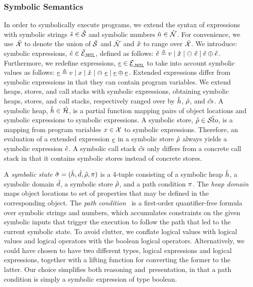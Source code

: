 \subsubsection{Symbolic Semantics}
In order to symbolically execute \jsil programs, we extend the syntax of \jsil expressions with 
symbolic strings $\hat{s} \in \hat{\mathcal{S}}$ and symbolic numbers $\hat{n} \in \hat{\mathcal{N}}$. 
For convenience, we use $\hat{\mathcal{X}}$ to denote the union of $\hat{\mathcal{S}}$ and $\hat{\mathcal{N}}$ 
and $\hat{x}$ to range over $\hat{\mathcal{X}}$. We introduce: \jsil symbolic expressions, $\hat{e} \in \hat{\mathcal{E}}_{\mathtt{JSIL}}$, defined as follows: $\hat{e} \triangleq v \mid \hat{x} \mid \ominus\ \hat{e} \mid \hat{e} \oplus \hat{e}$. 
Furthermore, we redefine \jsil expressions, $\underline{e} \in \underline{{\mathcal{E}}}_{\mathtt{JSIL}}$ to take into account symbolic values
 as follows: $\underline{e} \triangleq v \mid x \mid \hat{x} \mid \ominus\ \underline{e} \mid \underline{e} \oplus \underline{e}$.
Extended \jsil expressions differ from symbolic expressions in that they can contain program variables.
We extend heaps, stores, and call stacks with symbolic expressions, obtaining symbolic 
heaps, stores, and call stacks, respectively ranged over by $\hat{h}$, $\hat\rho$, and $\hat{cs}$.
A symbolic heap, $\hat{h} \in \hat{\mathcal H}$, is a partial function mapping pairs of  
object locations and symbolic expressions to symbolic expressions. 
A symbolic store, $\hat\rho \in \hat{{\mathcal S}to}$, is a mapping from program variables 
$x \in \mathcal{X}$ to symbolic expressions. Therefore, an evaluation of a \jsil extended expression $\underline{e}$ in a symbolic store $\hat\rho$ always yields a 
symbolic expression $\hat{e}$.
A symbolic call stack $\hat{cs}$ only differs from a concrete call stack in that it contains 
symbolic stores instead of concrete stores.


A \emph{symbolic state} $\hat{\sigma} = (\hat{h}, \hat{d}, \hat\rho, \pi)$ is a 4-tuple consisting of a 
symbolic heap $\hat{h}$, a symbolic domain $\hat{d}$, a symbolic store $\hat\rho$, and a path condition $\pi$. 
The \emph{heap domain} maps object locations to set of properties that may be defined in the corresponding object.  
The \emph{path condition}~\cite{symb:exec:survey} is a first-order quantifier-free formula over symbolic strings and 
numbers, which accumulates constraints on the given symbolic inputs that trigger 
the execution to follow the path that led to the current symbolic state.
To avoid clutter, we conflate logical values with \jsil logical values and \jsil logical 
operators with the boolean logical operators. Alternatively, we could have chosen to 
have two different types, \jsil logical expressions and logical expressions, together with a lifting 
function for converting the former to the latter. Our choice simplifies both reasoning 
and~presentation, in that a path condition is simply a \jsil symbolic expression of type boolean. 

